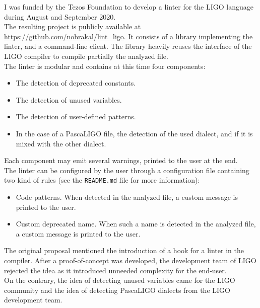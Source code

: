 I was funded by the Tezos Foundation to develop a linter for the LIGO language during August and September 2020.\\
The resulting project is publicly available at \url{https://github.com/nobrakal/lint\_ligo}.
It consists of a library implementing the linter, and a command-line client.
The library heavily reuses the interface of the LIGO compiler to compile partially the analyzed file.\\
The linter is modular and contains at this time four components:

\begin{itemize}
\item The detection of deprecated constants.
\item The detection of unused variables.
\item The detection of user-defined patterns.
\item In the case of a PascaLIGO file, the detection of the used dialect, and if it is mixed with the other dialect.
\end{itemize}

Each component may emit several warnings, printed to the user at the end.\\
The linter can be configured by the user through a configuration file containing two kind of rules (see the \verb|README.md| file for more information):
\begin{itemize}
\item Code patterns. When detected in the analyzed file, a custom message is printed to the user.
\item Custom deprecated name. When such a name is detected in the analyzed file, a custom message is printed to the user.
\end{itemize}

The original proposal mentioned the introduction of a hook for a linter in the compiler. After a proof-of-concept was developed, the development team of LIGO rejected the idea as it introduced unneeded complexity for the end-user.\\
On the contrary, the idea of detecting unused variables came for the LIGO community and the idea of detecting PascaLIGO dialects from the LIGO development team.